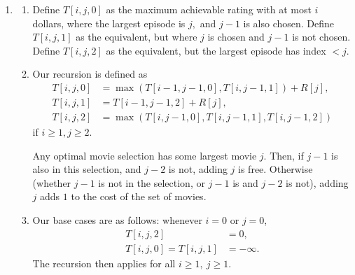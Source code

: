 \documentclass[12pt]{article}
\begin{document}
\begin{enumerate}
\begin{enumerate}
\begin{enumerate}
            Thus, if $T[i - 1, j - 7]$ and $T[i, j - 1]$ are correct,
            then $T[i, j]$ is correct.

          \item Our base cases are $T[0, j] = 0$ for $0 \leq j \leq
            n,$ and $T[i, 0] = 0$ for $0 \leq i \leq k.$

          \item Cell $T[k, n]$ contains the solution, since this is
            the maximum score with at most $k$ knights over all
            paintings $1, \ldots, n.$

          \item There are $\mathcal O(nk)$ cells and each cell
            requires $\mathcal O(1)$ work if we pre-compute $C$ and
            the prefix sums of $A,$ meaning this algorithm takes
            $\mathcal O(nk)$ time.
        \end{enumerate}
    \end{enumerate}

  \item
    \begin{enumerate}
      \item Define $T[i, j, 0]$ as the maximum achievable rating with
        at most $i$ dollars, where the largest episode is $j,$ and $j
        - 1$ is also chosen. Define $T[i, j, 1]$ as the equivalent,
        but where $j$ is chosen and $j - 1$ is not chosen. Define
        $T[i, j, 2]$ as the equivalent, but the largest episode has index $< j.$

      \item Our recursion is defined as
        \begin{align*}
          T[i, j, 0] &= \max(T[i - 1, j - 1, 0], T[i, j - 1, 1]) + R[j], \\
          T[i, j, 1] &= T[i - 1, j - 1, 2] + R[j], \\
          T[i, j, 2] &= \max(T[i, j - 1, 0], T[i, j - 1, 1], T[i, j -1, 2])
        \end{align*}
        if $i \geq 1, j \geq 2.$

        Any optimal movie selection has some largest movie $j.$ Then,
        if $j - 1$ is also in this selection, and $j - 2$ is not,
        adding $j$ is free. Otherwise (whether $j - 1$ is not in the
        selection, or $j - 1$ is and $j - 2$ is not), adding $j$ adds
        $1$ to the cost of the set of movies.

      \item Our base cases are as follows: whenever $i = 0$ or $j = 0$,
        \begin{align*}
          T[i, j, 2] &= 0, \\
          T[i, j, 0] = T[i, j, 1] &= -\infty.
        \end{align*}
        The recursion then applies for all $i \geq 1, \ j \geq 1.$


\end{enumerate}
\end{enumerate}
\end{document}
